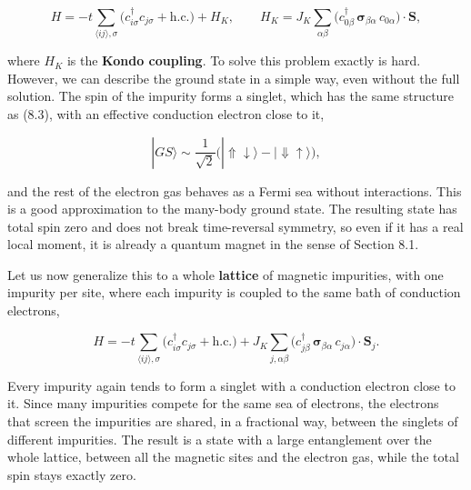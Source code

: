 \begin{equation}
H = -t\sum_{\langle ij\rangle,\sigma}\Big(c^\dagger_{i\sigma}c_{j\sigma} + \text{h.c.}\Big) +
H_K, \qquad H_K = J_K\sum_{\alpha\beta}\Big(c^\dagger_{0\beta}\,\boldsymbol\sigma_{\beta\alpha}\,
c_{0\alpha}\Big)\cdot \mathbf S,
\end{equation}

where $H_K$ is the \textbf{Kondo coupling}. To solve this problem exactly is hard. However, we
can describe the ground state in a simple way, even without the full solution. The spin of the impurity forms a singlet, which has the same structure
as (8.3), with an effective conduction electron close to it,

\begin{equation*}
|GS\rangle \sim \frac{1}{\sqrt2}\Big(|{\Uparrow\downarrow}\rangle -
|{\Downarrow\uparrow}\rangle\Big),
\end{equation*}

and the rest of the electron gas behaves as a Fermi sea without interactions. This is a good
approximation to the many-body ground state. The resulting state has total spin zero and does
not break time-reversal symmetry, so even if it has a real local moment, it is already a quantum
magnet in the sense of Section 8.1.

Let us now generalize this to a whole \textbf{lattice} of magnetic impurities, with one impurity per
site, where each impurity is coupled to the same bath of conduction electrons,

\begin{equation}
H = -t\sum_{\langle ij\rangle,\sigma}\Big(c^\dagger_{i\sigma}c_{j\sigma} + \text{h.c.}\Big) +
J_K\sum_{j,\alpha\beta}\Big(c^\dagger_{j\beta}\,\boldsymbol\sigma_{\beta\alpha}\,c_{j\alpha}\Big)\cdot
\mathbf S_j.
\end{equation}

Every impurity again tends to form a singlet with a conduction electron close to it. Since many
impurities compete for the same sea of electrons, the electrons that screen the impurities are
shared, in a fractional way, between the singlets of different impurities. The result is a state
with a large entanglement over the whole lattice, between all the magnetic sites and the electron
gas, while the total spin stays exactly zero.

